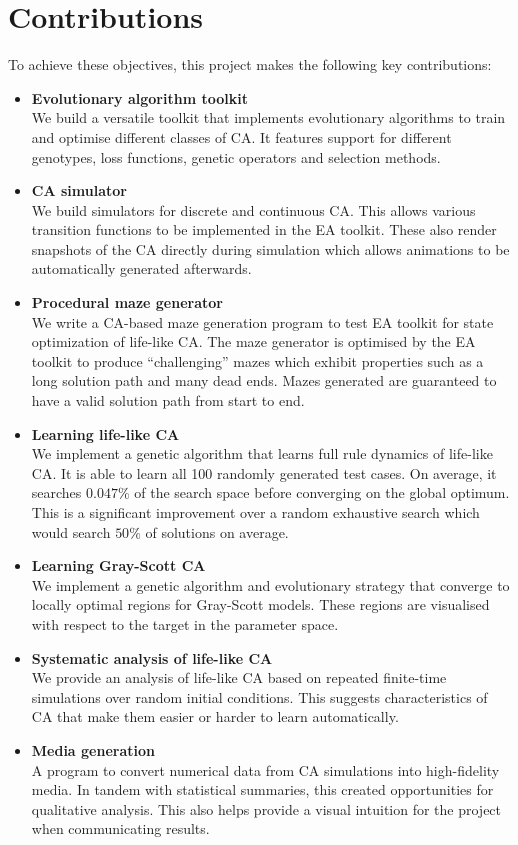 \section{Contributions}
To achieve these objectives, this project makes the following key contributions:
\begin{itemize}
    \item \textbf{Evolutionary algorithm toolkit}\\ We build a versatile toolkit that implements evolutionary algorithms to train and optimise different classes of CA. It features support for different genotypes, loss functions, genetic operators and selection methods.
    \item \textbf{CA simulator}\\ We build simulators for discrete and continuous CA. This allows various transition functions to be implemented in the EA toolkit. These also render snapshots of the CA directly during simulation which allows animations to be automatically generated afterwards.
    \item \textbf{Procedural maze generator}\\ We write a CA-based maze generation program to test EA toolkit for state optimization of life-like CA. The maze generator is optimised by the EA toolkit to produce ``challenging'' mazes which exhibit properties such as a long solution path and many dead ends. Mazes generated are guaranteed to have a valid solution path from start to end.
    \item \textbf{Learning life-like CA}\\ We implement a genetic algorithm that learns full rule dynamics of life-like CA. It is able to learn all 100 randomly generated test cases. On average, it searches $0.047\%$ of the search space before converging on the global optimum. This is a significant improvement over a random exhaustive search which would search $50\%$ of solutions on average.
    \item \textbf{Learning Gray-Scott CA}\\ We implement a genetic algorithm and evolutionary strategy that converge to locally optimal regions for Gray-Scott models. These regions are visualised with respect to the target in the parameter space.
    \item \textbf{Systematic analysis of life-like CA}\\ We provide an analysis of life-like CA based on repeated finite-time simulations over random initial conditions. This suggests characteristics of CA that make them easier or harder to learn automatically.
    \item \textbf{Media generation}\\ A program to convert numerical data from CA simulations into high-fidelity media. In tandem with statistical summaries, this created opportunities for qualitative analysis. This also helps provide a visual intuition for the project when communicating results.
\end{itemize}

